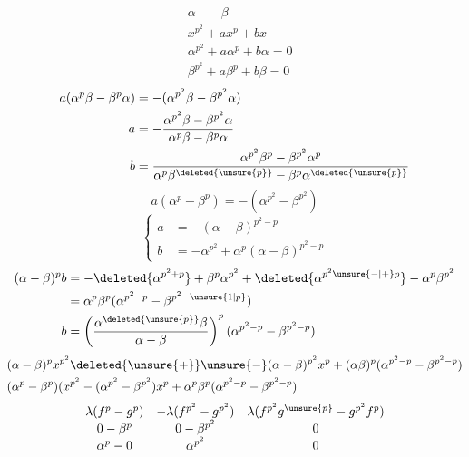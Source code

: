 \[
 \begin{aligned}
 &\alpha\qquad\beta\\
 &x^{p^2}+ax^p+bx\\
 &\alpha^{p^2}+a\alpha^p+b\alpha=0\\
 &\beta^{p^2}+a\beta^p+b\beta=0
 \end{aligned}
\]
\[
 \begin{aligned}
 a(\alpha^p\beta-\beta^p\alpha)&=-(\alpha^{p^2}\beta-\beta^{p^2}\alpha)\\
 a&=-\frac{\alpha^{p^2}\beta-\beta^{p^2}\alpha}{\alpha^p\beta-\beta^p\alpha}\\
 b&=\frac{\alpha^{p^2}\beta^p-\beta^{p^2}\alpha^p}
 {\alpha^p\beta^{\deleted{\unsure{p}}}-\beta^p\alpha^{\deleted{\unsure{p}}}}
 \end{aligned}
\]
\[
 a(\alpha^p-\beta^p)=-(\alpha^{p^2}-\beta^{p^2})
\]
\[
 \left\{\begin{aligned}
 a&=-(\alpha-\beta)^{p^2-p}\\
 b&=-\alpha^{p^2}+\alpha^p(\alpha-\beta)^{p^2-p}
 \end{aligned}\right.
\]
\[
 \begin{aligned}
 (\alpha-\beta)^p b
 &=-\deleted{\alpha^{p^2+p}}+\beta^p\alpha^{p^2}
    +\deleted{\alpha^{p^2\unsure{-|+}p}}-\alpha^p\beta^{p^2}\\
 &=\alpha^p\beta^p(\alpha^{p^2-p}-\beta^{p^2-\unsure{1|p}})\\
 b&=\left(\frac{\alpha^{\deleted{\unsure{p}}}\beta}{\alpha-\beta}\right)^p
       (\alpha^{p^2-p}-\beta^{p^2-p})
 \end{aligned}
\]
\[
 \begin{aligned}
 &(\alpha-\beta)^p x^{p^2}\deleted{\unsure{+}}\unsure{-}(\alpha-\beta)^{p^2}x^p+
 (\alpha\beta)^p(\alpha^{p^2-p}-\beta^{p^2-p})\\
 &(\alpha^p-\beta^p)(x^{p^2}-(\alpha^{p^2}-\beta^{p^2})x^p+
 \alpha^p\beta^p(\alpha^{p^2-p}-\beta^{p^2-p})
 \end{aligned}
\]
\[
 \begin{array}{ccc}
 \lambda(f^p-g^p)&-\lambda(f^{p^2}-g^{p^2})&
 \lambda(f^{p^2}g^{\unsure{p}}-g^{p^2}f^p)\\
 0-\beta^p&0-\beta^{p^2}&0\\
 \alpha^p-0&\alpha^{p^2}&0
 \end{array}
\]
